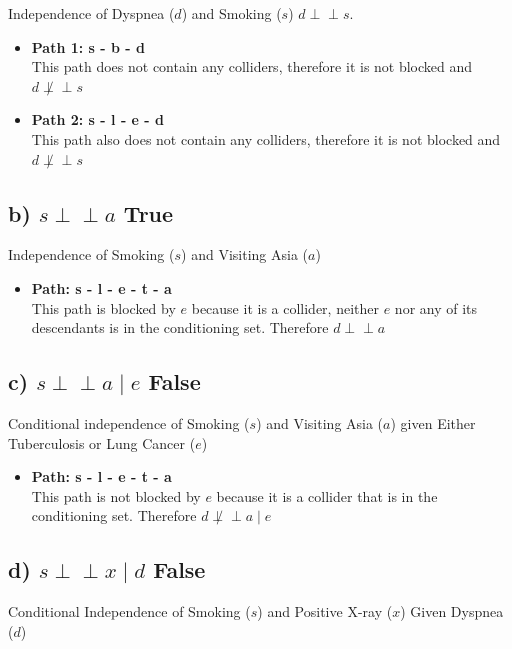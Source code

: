 \documentclass[12pt]{report}
\begin{document}
Independence of Dyspnea (\(d\)) and Smoking (\(s\))  \(d \perp\!\!\!\perp s\).

\begin{itemize}
    \item \textbf{Path 1: s - b - d }   \\    
This path does not contain any colliders, therefore it is not blocked and \(d \not\perp\!\!\!\perp s\)
    \item \textbf{Path 2: s - l - e - d } \\    
This path also does not contain any colliders, therefore it is not blocked and \(d \not\perp\!\!\!\perp s\)
\end{itemize}

\subsection*{b) \(s \perp\!\!\!\perp a\) True }
Independence of Smoking (\(s\)) and Visiting Asia (\(a\))

\begin{itemize}
    \item \textbf{Path: s - l - e - t - a} \\
    This path is blocked by $e$ because it is a collider, neither $e$ nor any of its descendants is in the conditioning set. Therefore \(d \perp\!\!\!\perp a\)
\end{itemize}


\subsection*{c) \(s \perp\!\!\!\perp a \mid e \) False }
Conditional independence of Smoking (\(s\)) and Visiting Asia (\(a\)) given Either Tuberculosis or Lung Cancer (\(e\))

\begin{itemize}
    \item \textbf{Path: s - l - e - t - a} \\
     This path is not blocked by $e$ because it is a collider that is in the conditioning set. Therefore \(d \not\perp\!\!\!\perp a \mid e \)
\end{itemize}



\subsection*{d) \(s \perp\!\!\!\perp x \mid d\) False }
Conditional Independence of Smoking (\(s\)) and Positive X-ray (\(x\)) Given Dyspnea (\(d\))
\end{document}
